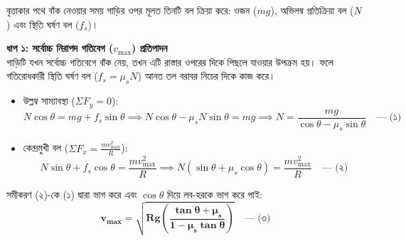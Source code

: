 \documentclass[12pt, a4paper]{article}
\begin{document}
\begin{tcolorbox}[solutionbox={সমাধান (Solution)}]
\noindent
বৃত্তাকার পথে বাঁক নেওয়ার সময় গাড়ির ওপর মূলত তিনটি বল ক্রিয়া করে: ওজন ($mg$), অভিলম্ব প্রতিক্রিয়া বল ($N$) এবং স্থিতি ঘর্ষণ বল ($f_s$)।

\vspace{0.5em}
\noindent
\textbf{ধাপ ১: সর্বোচ্চ নিরাপদ গতিবেগ ($v_{\text{max}}$) প্রতিপাদন} \\
গাড়িটি যখন সর্বোচ্চ গতিবেগে বাঁক নেয়, তখন এটি রাস্তার ওপরের দিকে পিছলে যাওয়ার উপক্রম হয়। ফলে গতিরোধকারী স্থিতি ঘর্ষণ বল ($f_s = \mu_s N$) আনত তল বরাবর নিচের দিকে কাজ করে।
\begin{itemize}[leftmargin=*, parsep=0.3ex]
    \item উল্লম্ব সাম্যাবস্থা ($\Sigma F_y = 0$): 
    \[ N \cos\theta = mg + f_s \sin\theta \implies N \cos\theta - \mu_s N \sin\theta = mg \implies N = \frac{mg}{\cos\theta - \mu_s \sin\theta} \quad \text{--- (১)} \]
    \item কেন্দ্রমুখী বল ($\Sigma F_x = \frac{m v_{\text{max}}^2}{R}$): 
    \[ N \sin\theta + f_s \cos\theta = \frac{m v_{\text{max}}^2}{R} \implies N(\sin\theta + \mu_s \cos\theta) = \frac{m v_{\text{max}}^2}{R} \quad \text{--- (২)} \]
\end{itemize}
সমীকরণ (২)-কে (১) দ্বারা ভাগ করে এবং $\cos\theta$ দিয়ে লব-হরকে ভাগ করে পাই:
\[ \mathbf{v_{\text{max}} = \sqrt{R g \left( \frac{\tan\theta + \mu_s}{1 - \mu_s \tan\theta} \right)}} \quad \text{--- (৩)} \]

\vspace{1em}
\begin{center}
\end{center}
\end{tcolorbox}
\end{document}
